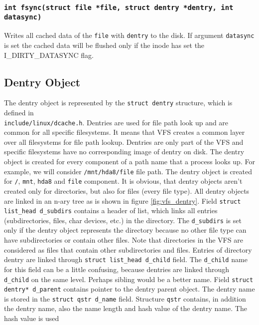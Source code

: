 \subsubsection{\texttt{int fsync(struct file *file, struct dentry *dentry, int datasync)}}

Writes all cached data of the \texttt{file} with \texttt{dentry} to the disk. If
argument \texttt{datasync} is set the cached data will be flushed only if the inode
has set the I\_DIRTY\_DATASYNC flag.

\subsection{Dentry Object}
\label{lab:dentry}
The dentry object is represented by the \texttt{struct dentry} structure, which is defined
in\\ \texttt{include/linux/dcache.h}. Dentries are used for file path
look up and are common for all specific filesystems. It means that VFS creates
a common layer over all filesystems for file path lookup. Dentries
are only part of the VFS and specific filesystems have no corresponding image of
dentry on disk. The dentry object is created for every component of a path name that a
process looks up. For example, we will consider \texttt{/mnt/hda8/file} file path.
The dentry object is created for \texttt{/}, \texttt{mnt}, \texttt{hda8} and \texttt{file}
component. It is obvious, that dentry objects aren't created only for directories, but
also for files (every file type). All dentry objects are linked in an n-ary tree as is
shown in figure \ref{fig:vfs_dentry}. Field \texttt{struct list\_head d\_subdirs}
contains a header of list, which links all entries (subdirectories, files, char devices,
etc.) in the directory. The \texttt{d\_subdirs} is set only if the dentry object
represents the directory because no other file type can have subdirectories or contain
other files. Note that directories in the VFS are considered as files that contain
other subdirectories and files. Entries of directory dentry are linked through
\texttt{struct list\_head d\_child} field. The \texttt{d\_child} name for this field
can be a little confusing, because dentries are linked through \texttt{d\_child} on
the same level. Perhaps sibling would be a better name. Field \texttt{struct dentry*
d\_parent} contains pointer to the dentry parent object. The dentry name is stored in the
\texttt{struct qstr d\_name} field. Structure \texttt{qstr} contains, in addition the dentry
name, also the name length and hash value of the dentry name. The hash value is used
